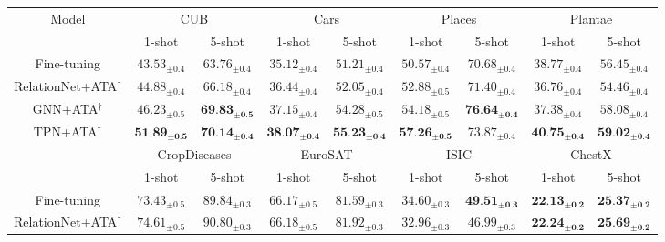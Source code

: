 \documentclass{article}
\begin{document}
\begin{table*}[ht]
\centering
\begin{tabular}{ccccccccc}
\toprule
\multicolumn{1}{c}{\multirow{2}{*}{Model}}&\multicolumn{2}{c}{CUB}&\multicolumn{2}{c}{Cars}&\multicolumn{2}{c}{Places}&\multicolumn{2}{c}{Plantae}
\\ \cmidrule(lr){2-3} \cmidrule(lr){4-5} \cmidrule(lr){6-7} \cmidrule(lr){8-9}
\multicolumn{1}{c}{} & \multicolumn{1}{c}{1-shot}&\multicolumn{1}{c}{5-shot} & \multicolumn{1}{c}{1-shot}&\multicolumn{1}{c}{5-shot} & \multicolumn{1}{c}{1-shot}&\multicolumn{1}{c}{5-shot} & \multicolumn{1}{c}{1-shot}&\multicolumn{1}{c}{5-shot} \\
\hline
Fine-tuning              & $43.53_{\pm0.4}$ & $63.76_{\pm0.4}$ & $35.12_{\pm0.4}$ & $51.21_{\pm0.4}$ & $50.57_{\pm0.4}$ & $70.68_{\pm0.4}$ & $38.77_{\pm0.4}$ & $56.45_{\pm0.4}$ \\
RelationNet+ATA$^{\dag}$ & $44.88_{\pm0.4}$ & $66.18_{\pm0.4}$ & $36.44_{\pm0.4}$ & $52.05_{\pm0.4}$ & $52.88_{\pm0.5}$ & $71.40_{\pm0.4}$ & $36.76_{\pm0.4}$ & $54.46_{\pm0.4}$ \\
GNN+ATA$^{\dag}$         & $46.23_{\pm0.5}$ & $\textbf{69.83}_{\pm\textbf{0.5}}$ & $37.15_{\pm0.4}$ & $54.28_{\pm0.5}$ & $54.18_{\pm0.5}$ & $\textbf{76.64}_{\pm\textbf{0.4}}$ & $37.38_{\pm0.4}$ & $58.08_{\pm0.4}$ \\
TPN+ATA$^{\dag}$         & $\textbf{51.89}_{\pm\textbf{0.5}}$ & $\textbf{70.14}_{\pm\textbf{0.4}}$ & $\textbf{38.07}_{\pm\textbf{0.4}}$ & $\textbf{55.23}_{\pm\textbf{0.4}}$ & $\textbf{57.26}_{\pm\textbf{0.5}}$ & $73.87_{\pm0.4}$ & $\textbf{40.75}_{\pm\textbf{0.4}}$ & $\textbf{59.02}_{\pm\textbf{0.4}}$ \\
\midrule
\multicolumn{1}{c}{\multirow{2}{*}{}}&\multicolumn{2}{c}{CropDiseases}&\multicolumn{2}{c}{EuroSAT}&\multicolumn{2}{c}{ISIC}&\multicolumn{2}{c}{ChestX}
\\ \cmidrule(lr){2-3} \cmidrule(lr){4-5} \cmidrule(lr){6-7} \cmidrule(lr){8-9}
\multicolumn{1}{c}{} & \multicolumn{1}{c}{1-shot}&\multicolumn{1}{c}{5-shot} & \multicolumn{1}{c}{1-shot}&\multicolumn{1}{c}{5-shot} & \multicolumn{1}{c}{1-shot}&\multicolumn{1}{c}{5-shot} & \multicolumn{1}{c}{1-shot}&\multicolumn{1}{c}{5-shot} \\
\hline
Fine-tuning          & $73.43_{\pm0.5}$ & $89.84_{\pm0.3}$ & $66.17_{\pm0.5}$ & $81.59_{\pm0.3}$ & $34.60_{\pm0.3}$ & $\textbf{49.51}_{\pm\textbf{0.3}}$ & $\textbf{22.13}_{\pm\textbf{0.2}}$ & $\textbf{25.37}_{\pm\textbf{0.2}}$ \\
RelationNet+ATA$^{\dag}$ & $74.61_{\pm0.5}$ & $90.80_{\pm0.3}$ & $66.18_{\pm0.5}$ & $81.92_{\pm0.3}$ & $32.96_{\pm0.3}$ & $46.99_{\pm0.3}$ & $\textbf{22.24}_{\pm\textbf{0.2}}$ & $\textbf{25.69}_{\pm\textbf{0.2}}$ \\

\end{tabular}
\end{table*}
\end{document}
